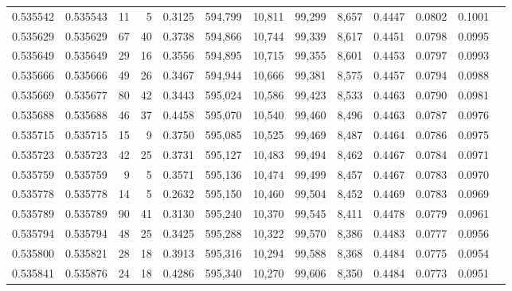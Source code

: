 \begin{tabular}{rrrrrrrrrrrrr}
0.535542 & 0.535543 &    11 &     5 &                                     0.3125 & 594,799 &  10,811 &  99,299 &   8,657 & 0.4447 & 0.0802 & 0.1001 \\
0.535629 & 0.535629 &    67 &    40 &                                     0.3738 & 594,866 &  10,744 &  99,339 &   8,617 & 0.4451 & 0.0798 & 0.0995 \\
0.535649 & 0.535649 &    29 &    16 &                                     0.3556 & 594,895 &  10,715 &  99,355 &   8,601 & 0.4453 & 0.0797 & 0.0993 \\
0.535666 & 0.535666 &    49 &    26 &                                     0.3467 & 594,944 &  10,666 &  99,381 &   8,575 & 0.4457 & 0.0794 & 0.0988 \\
0.535669 & 0.535677 &    80 &    42 &                                     0.3443 & 595,024 &  10,586 &  99,423 &   8,533 & 0.4463 & 0.0790 & 0.0981 \\
0.535688 & 0.535688 &    46 &    37 &                                     0.4458 & 595,070 &  10,540 &  99,460 &   8,496 & 0.4463 & 0.0787 & 0.0976 \\
0.535715 & 0.535715 &    15 &     9 &                                     0.3750 & 595,085 &  10,525 &  99,469 &   8,487 & 0.4464 & 0.0786 & 0.0975 \\
0.535723 & 0.535723 &    42 &    25 &                                     0.3731 & 595,127 &  10,483 &  99,494 &   8,462 & 0.4467 & 0.0784 & 0.0971 \\
0.535759 & 0.535759 &     9 &     5 &                                     0.3571 & 595,136 &  10,474 &  99,499 &   8,457 & 0.4467 & 0.0783 & 0.0970 \\
0.535778 & 0.535778 &    14 &     5 &                                     0.2632 & 595,150 &  10,460 &  99,504 &   8,452 & 0.4469 & 0.0783 & 0.0969 \\
0.535789 & 0.535789 &    90 &    41 &                                     0.3130 & 595,240 &  10,370 &  99,545 &   8,411 & 0.4478 & 0.0779 & 0.0961 \\
0.535794 & 0.535794 &    48 &    25 &                                     0.3425 & 595,288 &  10,322 &  99,570 &   8,386 & 0.4483 & 0.0777 & 0.0956 \\
0.535800 & 0.535821 &    28 &    18 &                                     0.3913 & 595,316 &  10,294 &  99,588 &   8,368 & 0.4484 & 0.0775 & 0.0954 \\
0.535841 & 0.535876 &    24 &    18 &                                     0.4286 & 595,340 &  10,270 &  99,606 &   8,350 & 0.4484 & 0.0773 & 0.0951 \\

\end{tabular}

